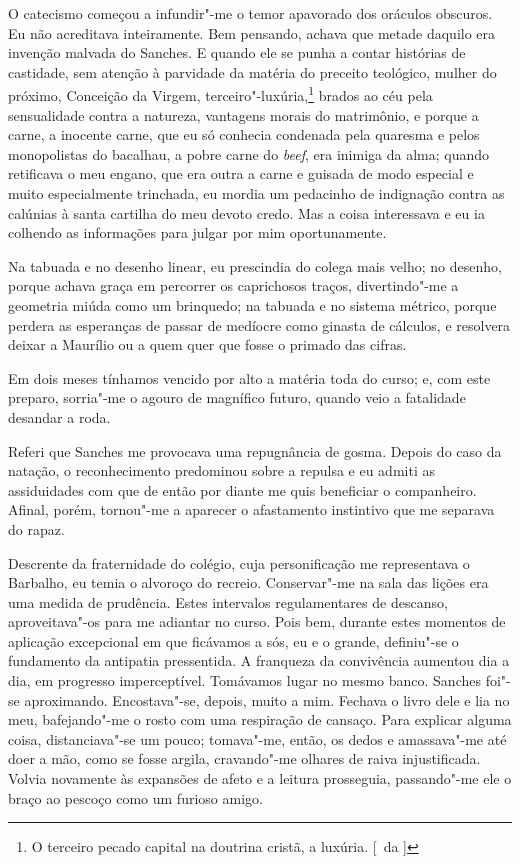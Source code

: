 O catecismo começou a infundir"-me o temor apavorado dos
oráculos obscuros. Eu não acreditava inteiramente. Bem pensando, achava
que metade daquilo era invenção malvada do Sanches. E quando ele se
punha a contar histórias de castidade, sem atenção à parvidade da
matéria do preceito teológico, mulher do próximo, Conceição da Virgem, 
terceiro"-luxúria,\footnote{ O terceiro pecado capital na doutrina cristã, a luxúria. 
[~da ]} brados ao céu pela sensualidade contra a natureza, vantagens morais do
matrimônio, e porque a carne, a inocente carne, que eu só conhecia
condenada pela quaresma e pelos monopolistas do bacalhau, a pobre carne
do \textit{beef}, era inimiga da alma; quando retificava o meu engano, que era
outra a carne e guisada de modo especial e muito especialmente
trinchada, eu mordia um pedacinho de indignação contra as calúnias à
santa cartilha do meu devoto credo. Mas a coisa interessava e eu ia
colhendo as informações para julgar por mim oportunamente. 

Na tabuada e no desenho linear, eu prescindia do colega mais velho; no desenho,
porque achava graça em percorrer os caprichosos traços, divertindo"-me
a geometria miúda como um brinquedo; na tabuada e no sistema métrico,
porque perdera as esperanças de passar de medíocre como ginasta de
cálculos, e resolvera deixar a Maurílio ou a quem quer que fosse o
primado das cifras. 

Em dois meses tínhamos vencido por alto a matéria
toda do curso; e, com este preparo, sorria"-me o agouro de magnífico
futuro, quando veio a fatalidade desandar a roda. 

Referi que Sanches me provocava uma repugnância de gosma. Depois do caso da 
natação, o reconhecimento predominou sobre a repulsa e eu admiti as assiduidades
com que de então por diante me quis beneficiar o companheiro. Afinal,
porém, tornou"-me a aparecer o afastamento instintivo que me separava do rapaz. 

Descrente da fraternidade do colégio, cuja personificação me
representava o Barbalho, eu temia o alvoroço do recreio. Conservar"-me
na sala das lições era uma medida de prudência. Estes intervalos
regulamentares de descanso, aproveitava"-os para me adiantar no curso.
Pois bem, durante estes momentos de aplicação excepcional em que
ficávamos a sós, eu e o grande, definiu"-se o fundamento da antipatia
pressentida. A franqueza da convivência aumentou dia a dia, em
progresso imperceptível. Tomávamos lugar no mesmo banco. Sanches
foi"-se aproximando. Encostava"-se, depois, muito a mim. Fechava o
livro dele e lia no meu, bafejando"-me o rosto com uma respiração de
cansaço. Para explicar alguma coisa, distanciava"-se um pouco;
tomava"-me, então, os dedos e amassava"-me até doer a mão, como se
fosse argila, cravando"-me olhares de raiva injustificada. Volvia
novamente às expansões de afeto e a leitura prosseguia, passando"-me
ele o braço ao pescoço como um furioso amigo. 

